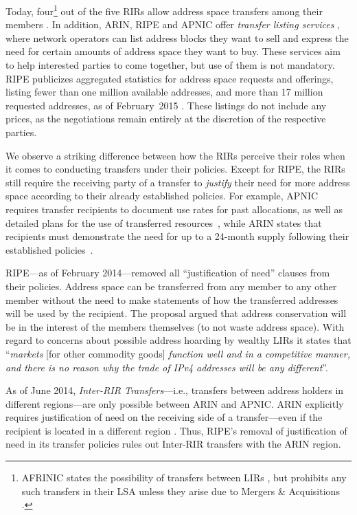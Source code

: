 \documentclass[letter]{sigcomm-alternate}
\begin{document}
Today, four\footnote{
	AFRINIC states the possibility of transfers between LIRs 
	\cite{afrinic_policy}, but prohibits any such transfers 
	in their LSA unless they arise due to Mergers \& Acquisitions 
	\cite{afrinic_property}. 
} 
out of the five RIRs allow address space transfers among their members
\cite{ripe_policy,arin_manual,lacnic_policy,apnic_policy}.  In addition, ARIN,
RIPE and APNIC offer \textit{transfer listing services}
\cite{ripe_transfer_list,arin_transfer_list,apnic_transfer_list}, where network
operators can list address blocks they want to sell and express the need for
certain amounts of address space they want to buy.  These services aim to help
interested parties to come together, but use of them is not mandatory. RIPE
publicizes aggregated statistics for address space requests and offerings,
listing fewer than one million available addresses, and more than 17 million
requested addresses, as of February~2015 \cite{ripe_transfer_list}. These 
listings do not include any prices, as the negotiations remain entirely at the
discretion of the respective parties.

We observe a striking difference between how the RIRs perceive their roles when
it comes to conducting transfers under their policies. Except for RIPE, the
RIRs still require the receiving party of a transfer to \textit{justify} their
need for more address space according to their already established policies.
For example, APNIC requires transfer recipients to document use rates for past
allocations, as well as detailed plans for the use of transferred
resources~\cite{apnic_policy}, while ARIN states that recipients must
demonstrate the need for up to a 24-month supply following their established
policies~\cite{arin_manual}.

RIPE---as of February 2014---removed all ``justification of need'' clauses from
their policies. Address space can be transferred from any member to any
other member without the need to make statements of how the transferred
addresses will be used by the recipient. The proposal
\cite{ripe_reality} argued that address conservation will be in the interest of 
the members themselves (to not waste address space).  With regard
to concerns about possible address hoarding by wealthy LIRs it states that
``\textit{markets} [for other commodity goods] \textit{function well and in a
competitive manner, and there is no reason why the trade of IPv4 addresses will
be any different}''.

As of June 2014, \textit{Inter-RIR Transfers}---i.e., transfers between
address holders in different regions---are only possible between ARIN and APNIC. ARIN 
explicitly requires justification of need on the receiving side of a 
transfer---even if the recipient is located in a different region 
\cite{arin_interir}. Thus, RIPE's removal of justification of need in its 
transfer policies rules out Inter-RIR transfers with the ARIN region.
\end{document}
